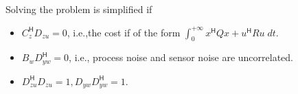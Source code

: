 
Solving the problem is simplified if
\begin{itemize}
    \item $C_{z}^{\mathsf{H}}D_{zu}=0$, i.e.,the cost if of the form $\int_0^{+\infty}x^{\mathsf{H}}Qx+u^{\mathsf{H}}Ru\;dt$.
    \item $B_w D_{yw}^{\mathsf{H}}=0$, i.e., process noise and sensor noise are uncorrelated.
    \item $D_{zu}^{\mathsf{H}}D_{zu}=1,D_{yw}D_{yw}^{\mathsf{H}}=1$.
\end{itemize}

